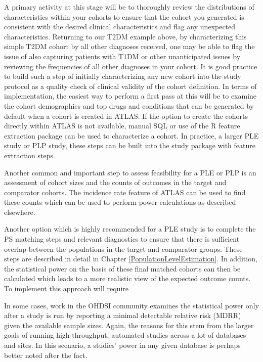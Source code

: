 \documentclass[11pt]{book}
\theoremstyle{definition}
\theoremstyle{definition}
\theoremstyle{definition}
\theoremstyle{remark}
\begin{document}
A primary activity at this stage will be to thoroughly review the distributions of characteristics within your cohorts to ensure that the cohort you generated is consistent with the desired clinical characteristics and flag any unexpected characteristics. Returning to our T2DM example above, by characterizing this simple T2DM cohort by all other diagnoses received, one may be able to flag the issue of also capturing patients with T1DM or other unanticipated issues by reviewing the frequencies of all other diagnoses in your cohort. It is good practice to build such a step of initially characterizing any new cohort into the study protocol as a quality check of clinical validity of the cohort definition. In terms of implementation, the easiest way to perform a first pass at this will be to examine the cohort demographics and top drugs and conditions that can be generated by default when a cohort is created in ATLAS. If the option to create the cohorts directly within ATLAS is not available, manual SQL or use of the R feature extraction package can be used to characterize a cohort. In practice, a larger PLE study or PLP study, these steps can be built into the study package with feature extraction steps.

Another common and important step to assess feasibility for a PLE or PLP is an assessment of cohort sizes and the counts of outcomes in the target and comparator cohorts. The incidence rate feature of ATLAS can be used to find these counts which can be used to perform power calculations as described elsewhere.

Another option which is highly recommended for a PLE study is to complete the PS matching steps and relevant diagnostics to ensure that there is sufficient overlap between the populations in the target and comparator groups. These steps are described in detail in Chapter \ref{PopulationLevelEstimation}. In addition, the statistical power on the basis of these final matched cohorts can then be calculated which leads to a more realistic view of the expected outcome counts. To implement this approach will require

In some cases, work in the OHDSI community examines the statistical power only after a study is run by reporting a minimal detectable relative risk (MDRR) given the available sample sizes. Again, the reasons for this stem from the larger goals of running high throughput, automated studies across a lot of databases and sites. In this scenario, a studies' power in any given database is perhaps better noted after the fact.
\end{document}
